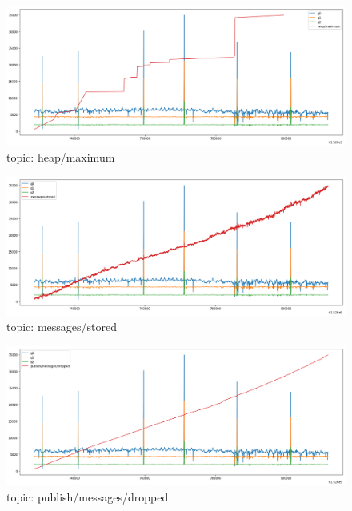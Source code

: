 \documentclass[12pt, letterpaper]{article}
\begin{document}
\begin{figure}
	\setlength{\tabcolsep}{0pt}
	\caption{topic: heap/maximum}
	\label{f:valid_cnt_heap_maximum}
	\begin{center}
		\includegraphics[width=\textwidth]{valid_cnt/valid_cnt-heap_maximum}	
	\end{center}
\end{figure}
\begin{figure}
	\setlength{\tabcolsep}{0pt}
	\caption{topic: messages/stored}
	\label{f:valid_cnt_messages_stored}
	\begin{center}
		\includegraphics[width=\textwidth]{valid_cnt/valid_cnt-messages_stored}	
	\end{center}
\end{figure}
\begin{figure}
	\setlength{\tabcolsep}{0pt}
	\caption{topic: publish/messages/dropped}
	\label{f:valid_cnt_publish_messages_dropped}
	\begin{center}
		\includegraphics[width=\textwidth]{valid_cnt/valid_cnt-publish_messages_dropped}	
	\end{center}
\end{figure}
\end{document}
